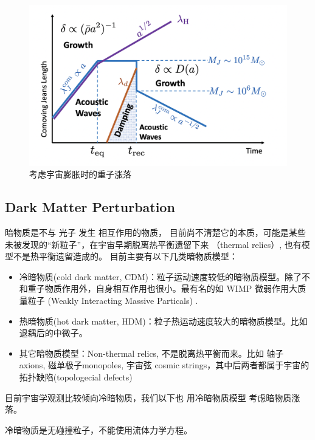 \documentclass[12pt]{ctexart}
\begin{document}
\begin{figure}[!hbtp]
	\centering 
	\includegraphics[width=1.0\linewidth]{Baryon_pert_H.png}
	\caption{考虑宇宙膨胀时的重子涨落}
    \label{fig:Bary_pert}
\end{figure}


\subsection{Dark Matter Perturbation}

暗物质是不与 光子 发生 相互作用的物质，
目前尚不清楚它的本质，可能是某些未被发现的“新粒子”，在宇宙早期脱离热平衡遗留下来 （thermal relics）,
也有模型不是热平衡遗留造成的。
目前主要有以下几类暗物质模型：
\begin{itemize}
    \item 冷暗物质(cold dark matter, CDM)：粒子运动速度较低的暗物质模型。除了不和重子物质作用外，自身相互作用也很小。最有名的如 WIMP 微弱作用大质量粒子 (Weakly Interacting Massive Particals) .
    \item 热暗物质(hot dark matter, HDM)：粒子热运动速度较大的暗物质模型。比如退耦后的中微子。
    \item 其它暗物质模型：Non-thermal relics, 不是脱离热平衡而来。比如 轴子 axions, 磁单极子monopoles, 宇宙弦 cosmic strings，其中后两者都属于宇宙的拓扑缺陷(topologecial defects)
\end{itemize}

目前宇宙学观测比较倾向冷暗物质，我们以下也 用冷暗物质模型 考虑暗物质涨落。

冷暗物质是无碰撞粒子，不能使用流体力学方程。
\end{document}
